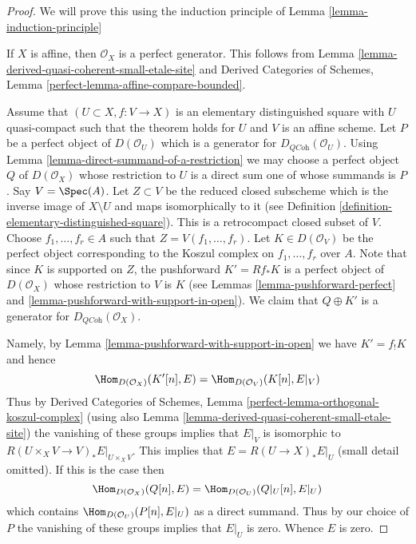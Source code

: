 \begin{proof}
We will prove this using the induction principle of
Lemma \ref{lemma-induction-principle}

\medskip\noindent
If $X$ is affine, then $\mathcal{O}_X$ is a perfect generator.
This follows from Lemma \ref{lemma-derived-quasi-coherent-small-etale-site}
and
Derived Categories of Schemes,
Lemma \ref{perfect-lemma-affine-compare-bounded}.

\medskip\noindent
Assume that $(U \subset X, f : V \to X)$ is an elementary distinguished
square with $U$ quasi-compact such that the theorem holds for $U$ and $V$
is an affine scheme.
Let $P$ be a perfect object of $D(\mathcal{O}_U)$ which is a generator
for $D_{\textit{QCoh}}(\mathcal{O}_U)$. Using
Lemma \ref{lemma-direct-summand-of-a-restriction} we may
choose a perfect object
$Q$ of $D(\mathcal{O}_X)$ whose restriction to $U$ is a direct sum one
of whose summands is $P$. Say $V = \Spec(A)$. Let $Z \subset V$
be the reduced closed subscheme which is the inverse image of
$X \setminus U$ and maps isomorphically to it
(see Definition \ref{definition-elementary-distinguished-square}).
This is a retrocompact closed subset of $V$.
Choose $f_1, \ldots, f_r \in A$ such that
$Z = V(f_1, \ldots, f_r)$. Let $K \in D(\mathcal{O}_V)$ be the perfect
object corresponding to the Koszul complex on $f_1, \ldots, f_r$ over $A$.
Note that since $K$ is supported on $Z$, the pushforward
$K' = Rf_*K$ is a perfect object of $D(\mathcal{O}_X)$ whose
restriction to $V$ is $K$ (see Lemmas \ref{lemma-pushforward-perfect}
and \ref{lemma-pushforward-with-support-in-open}).
We claim that $Q \oplus K'$ is a generator for
$D_{\textit{QCoh}}(\mathcal{O}_X)$.

\medskip\noindent
Namely, by Lemma \ref{lemma-pushforward-with-support-in-open}
we have $K' =  f_! K$ and hence
$$
\Hom_{D(\mathcal{O}_X)}(K'[n], E) = \Hom_{D(\mathcal{O}_V)}(K[n], E|_V)
$$
Thus by
Derived Categories of Schemes,
Lemma \ref{perfect-lemma-orthogonal-koszul-complex}
(using also
Lemma \ref{lemma-derived-quasi-coherent-small-etale-site})
the vanishing of these groups implies that $E|_V$ is isomorphic to
$R(U \times_X V \to V)_*E|_{U \times_X V}$. This implies that
$E = R(U \to X)_*E|_U$ (small detail omitted). If this is the case then
$$
\Hom_{D(\mathcal{O}_X)}(Q[n], E) = \Hom_{D(\mathcal{O}_U)}(Q|_U[n], E|_U)
$$
which contains $\Hom_{D(\mathcal{O}_U)}(P[n], E|_U)$ as a direct summand.
Thus by our choice of $P$ the vanishing of these groups implies that $E|_U$
is zero. Whence $E$ is zero.
\end{proof}








